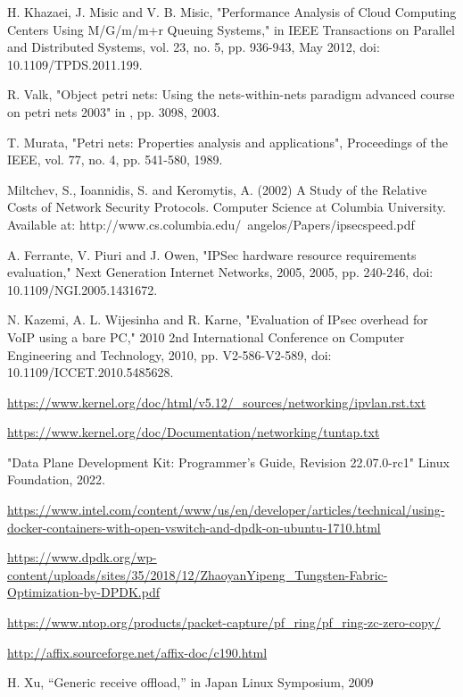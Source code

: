 \documentclass[conference]{IEEEtran}
\begin{document}
\begin{thebibliography}{1}
H. Khazaei, J. Misic and V. B. Misic, "Performance Analysis of Cloud Computing Centers Using M/G/m/m+r Queuing Systems," in IEEE Transactions on Parallel and Distributed Systems, vol. 23, no. 5, pp. 936-943, May 2012, doi: 10.1109/TPDS.2011.199.

R. Valk, "Object petri nets: Using the nets-within-nets paradigm advanced course on petri nets 2003" in , pp. 3098, 2003.

T. Murata, "Petri nets: Properties analysis and applications", Proceedings of the IEEE, vol. 77, no. 4, pp. 541-580, 1989.

Miltchev, S., Ioannidis, S. and Keromytis, A. (2002) A Study of the Relative Costs of Network Security Protocols. Computer Science at Columbia University. Available at: http://www.cs.columbia.edu/~angelos/Papers/ipsecspeed.pdf

A. Ferrante, V. Piuri and J. Owen, "IPSec hardware resource requirements evaluation," Next Generation Internet Networks, 2005, 2005, pp. 240-246, doi: 10.1109/NGI.2005.1431672.

N. Kazemi, A. L. Wijesinha and R. Karne, "Evaluation of IPsec overhead for VoIP using a bare PC," 2010 2nd International Conference on Computer Engineering and Technology, 2010, pp. V2-586-V2-589, doi: 10.1109/ICCET.2010.5485628.

\url{https://www.kernel.org/doc/html/v5.12/_sources/networking/ipvlan.rst.txt}

\url{https://www.kernel.org/doc/Documentation/networking/tuntap.txt}

"Data Plane Development Kit: Programmer's Guide, Revision 22.07.0-rc1" Linux Foundation, 2022.

\url{https://www.intel.com/content/www/us/en/developer/articles/technical/using-docker-containers-with-open-vswitch-and-dpdk-on-ubuntu-1710.html}

\url{https://www.dpdk.org/wp-content/uploads/sites/35/2018/12/ZhaoyanYipeng_Tungsten-Fabric-Optimization-by-DPDK.pdf}

\url{https://www.ntop.org/products/packet-capture/pf_ring/pf_ring-zc-zero-copy/}

\url{http://affix.sourceforge.net/affix-doc/c190.html}

H. Xu, “Generic receive offload,” in Japan Linux Symposium, 2009

\end{thebibliography}

\end{document}
